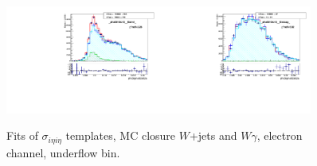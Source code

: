 \begin{figure}[htb]
  \begin{center}
   \includegraphics[width=0.45\textwidth]{../figs/figs_v11/ELECTRON_WGamma/MCclosureWjetsPlusWg/c_TEMPL_SIHIH_UNblind__phoEt10to15__Barrel__RooFit_MCclosure.pdf}\includegraphics[width=0.45\textwidth]{../figs/figs_v11/ELECTRON_WGamma/MCclosureWjetsPlusWg/c_TEMPL_SIHIH_UNblind__phoEt10to15__Endcap__RooFit_MCclosure.pdf}\\
  \label{fig:templateFits_MCclosureWjetsPlusWg_SIHIH_ELECTRON_0}
  \caption{Fits of $\sigma_{i \eta i \eta}$ templates, MC closure $W$+jets and $W\gamma$, electron channel, underflow bin.}
  \end{center}
\end{figure}

\

